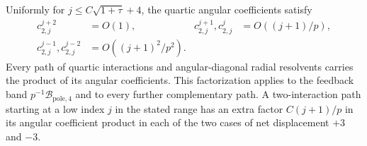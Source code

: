 \begin{lemma}\label{inf:path-valuation}
Uniformly for $j\le C\sqrt{1+\tau}+4$, the quartic angular
coefficients satisfy
\begin{equation}\label{inf:low-coefficient-valuations}
 \begin{aligned}
 c_{2,j}^{j+2}&=O(1),&
 c_{2,j}^{j+1},c_{2,j}^j&=O((j+1)/p),\\
 c_{2,j}^{j-1},c_{2,j}^{j-2}&=O((j+1)^2/p^2).
 \end{aligned}
\end{equation}
Every path of quartic interactions and angular-diagonal radial
resolvents carries the product of its angular coefficients.
This factorization applies to the feedback band
$p^{-1}\mathcal B_{\mathrm{pole},4}$ and to every further complementary path.
A two-interaction path starting at a low index $j$ in the stated
range has an extra factor $C(j+1)/p$ in its angular coefficient
product in each of the two cases of net displacement $+3$ and $-3$.
\end{lemma}
